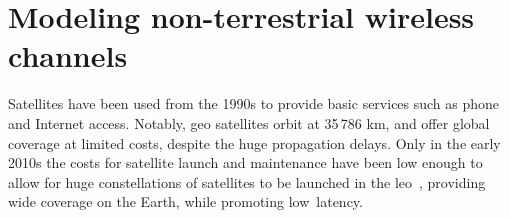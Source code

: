 



\section{Modeling non-terrestrial wireless channels}
\label{sec:channel-ntn}

Satellites have been used from the 1990s to provide basic services such as phone and Internet access. Notably, \gls{geo} satellites orbit at 35\,786 km, and offer global coverage at limited costs, despite the huge propagation delays. Only in the early 2010s the costs for satellite launch and maintenance have been low enough to allow for huge constellations of satellites to be launched in the \gls{leo}~\cite{satcost}, providing wide coverage on the Earth, while promoting low~latency. 

